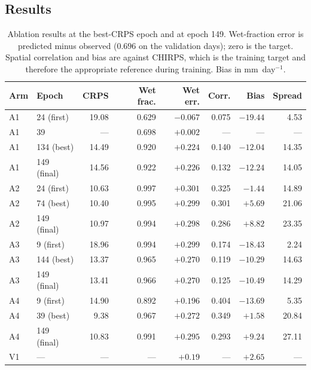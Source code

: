 \subsection{Results}

\begin{table}[htbp]
\centering
\caption{Ablation results at the best-CRPS epoch and at epoch 149. Wet-fraction
error is predicted minus observed ($0.696$ on the validation days); zero is the
target. Spatial correlation and bias are against CHIRPS, which is the training
target and therefore the appropriate reference during training. Bias in
mm~day$^{-1}$.}
\label{tab:ablation-results}
\begin{tabular}{llrrrrrr}
\hline
Arm & Epoch & CRPS & Wet frac. & Wet err. & Corr. & Bias & Spread \\
\hline
A1 & 24 (first)  & 19.08 & 0.629 & $-0.067$ & 0.075 & $-19.44$ & 4.53 \\
A1 & 39          & ---   & 0.698 & $+0.002$ & ---   & ---      & ---  \\
A1 & 134 (best)  & 14.49 & 0.920 & $+0.224$ & 0.140 & $-12.04$ & 14.35 \\
A1 & 149 (final) & 14.56 & 0.922 & $+0.226$ & 0.132 & $-12.24$ & 14.05 \\
\hline
A2 & 24 (first)  & 10.63 & 0.997 & $+0.301$ & 0.325 & $-1.44$  & 14.89 \\
A2 & 74 (best)   & 10.40 & 0.995 & $+0.299$ & 0.301 & $+5.69$  & 21.06 \\
A2 & 149 (final) & 10.97 & 0.994 & $+0.298$ & 0.286 & $+8.82$  & 23.35 \\
\hline
A3 & 9 (first)   & 18.96 & 0.994 & $+0.299$ & 0.174 & $-18.43$ & 2.24 \\
A3 & 144 (best)  & 13.37 & 0.965 & $+0.270$ & 0.119 & $-10.29$ & 14.63 \\
A3 & 149 (final) & 13.41 & 0.966 & $+0.270$ & 0.125 & $-10.49$ & 14.29 \\
\hline
A4 & 9 (first)   & 14.90 & 0.892 & $+0.196$ & 0.404 & $-13.69$ & 5.35 \\
A4 & 39 (best)   & 9.38  & 0.967 & $+0.272$ & 0.349 & $+1.58$  & 20.84 \\
A4 & 149 (final) & 10.83 & 0.991 & $+0.295$ & 0.293 & $+9.24$  & 27.11 \\
\hline
V1 & ---         & ---   & ---   & $+0.19$  & ---   & $+2.65$  & --- \\
\hline
\end{tabular}
\end{table}

